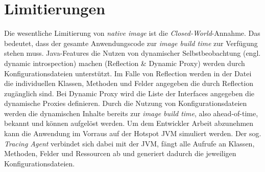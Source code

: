 \section{Limitierungen}
\label{sec:limitierungen}

Die wesentliche Limitierung von \textit{native image} ist die \textit{Closed-World}-Annahme. Das bedeutet, dass der gesamte Anwendungscode zur \textit{image build time} zur Verfügung
stehen muss. Java-Features die Nutzen von dynamischer Selbstbeobachtung (engl. dynamic introspection) machen (Reflection \& Dynamic Proxy) werden durch Konfigurationsdateien unterstützt.
Im Falle von Reflection werden in der Datei die individuellen Klassen, Methoden  und Felder angegeben die durch Reflection zugänglich sind. Bei Dynamic Proxy wird die Liste der Interfaces
angegeben die dynamische Proxies definieren. Durch die Nutzung von Konfigurationsdateien werden die dynamischen Inhalte bereits zur \textit{image build time}, also ahead-of-time, bekannt und
können aufgelöst werden. Um dem Entwickler Arbeit abzunehmen kann die Anwendung im Vorraus auf der Hotspot JVM simuliert werden. Der sog. \textit{Tracing Agent} verbindet sich dabei mit der JVM, fängt alle Aufrufe an Klassen, Methoden, Felder und Ressourcen ab und generiert dadurch die jeweiligen Konfigurationsdateien\parencite{GraalVMNativeImageTracingAgent}.

